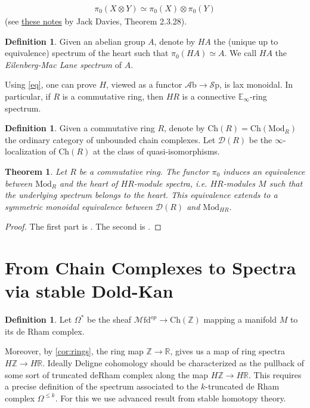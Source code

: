 \documentclass[10pt]{amsart}
\newcommand{\D}{\mathscr{D}}
\newcommand{\bE}{\mathbb{E}}
\newcommand{\bR}{\mathbb{R}}
\newcommand{\bZ}{\mathbb{Z}}
\newcommand{\Sp}{\mathscr{S}\mathrm{p}}
\newcommand{\Ch}{\mathrm{Ch}}
\newcommand{\Mfd}{\mathscr{M}\mathrm{fd}}
\newcommand{\Mod}{\mathrm{Mod}}
\newcommand{\Ab}{\mathscr{A}\mathrm{b}}
\newtheorem{theorem}[equation]{Theorem}
\theoremstyle{definition}
\newtheorem{definition}[equation]{Definition}
\theoremstyle{remark}
\begin{document}
\begin{align}\label{eq}
  \pi_0(X\otimes Y)\simeq\pi_0(X)\otimes\pi_0(Y)
\end{align}
(see \hyperlink{https://www.dropbox.com/scl/fi/j73uavecb4gxkmb6uk80b/ATII_script.pdf?rlkey=2v7ezb2ie3bmu8rlig3kwq7qa&e=1&st=pu7m5wgm&dl=0}{these notes} by Jack Davies, Theorem 2.3.28).
\begin{definition}Given an abelian group $A$, denote by $HA$ the (unique up to equivalence) spectrum of the heart such that $\pi_0(HA)\simeq A$. We call $HA$ the \emph{Eilenberg-Mac Lane spectrum} of $A$.
\end{definition}
Using \cref{eq}, one can prove $H$, viewed as a functor $\Ab\to\Sp$, is lax monoidal. In particular, if $R$ is a commutative ring, then $HR$ is a connective $\bE_\infty$-ring spectrum. 
\begin{definition}
  Given a commutative ring $R$, denote by $\Ch(R)=\Ch(\Mod_R)$ the ordinary category of unbounded chain complexes. Let $\D(R)$ be the $\infty$-localization of $\Ch(R)$ at the class of quasi-isomorphisms.  
\end{definition} 
\begin{theorem}
  Let $R$ be a commutative ring. The functor $\pi_0$ induces an equivalence between $\Mod_R$ and the heart of $HR$-module spectra, i.e. $HR$-modules $M$ such that the underlying spectrum belongs to the heart. This equivalence extends to a symmetric monoidal equivalence between $\D(R)$ and $\Mod_{HR}$.
\end{theorem}
\begin{proof}
  The first part is \cite[Proposition 7.1.1.13]{lurie2017ha}. The second is \cite[Theorem 7.1.2.13]{lurie2017ha}.
\end{proof}


\section{From Chain Complexes to Spectra via stable Dold-Kan}

\begin{definition}
  Let $\Omega^*$ be the sheaf $\Mfd^{op}\to\Ch(\bZ)$ mapping a manifold $M$ to its de Rham complex. 
\end{definition}


Moreover, by \cref{cor:rings}, the ring map $\bZ \to \bR$, gives us a map of ring spectra $H\bZ \to H\bR$. Ideally Deligne cohomology should be characterized as the pullback of some sort of truncated deRham complex along the map $H\bZ \to H\bR$. This requires a precise definition of the spectrum associated to the $k$-truncated de Rham complex $\Omega^{\leq k}$. For this we use advanced result from stable homotopy theory.
\end{document}
